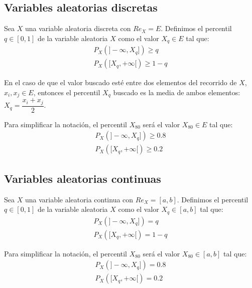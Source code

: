 \subsection{Variables aleatorias discretas}

\begin{definicion}
    Sea $X$ una variable aleatoria discreta con $Re_X=E$. Definimos el percentil $q\in [0, 1]$ de la variable aleatoria $X$ como el valor $X_q \in E$ tal que:
    $$\begin{array}{c}
        P_X(]-\infty, X_q]) \geq q \\
        P_X([X_q, +\infty[) \geq 1-q
    \end{array}$$

    En el caso de que el valor buscado esté entre dos elementos del recorrido de $X$, $x_i, x_j \in E$, entonces el percentil $X_q$ buscado es la media de ambos elementos: $X_q = \dfrac{x_i+x_j}{2}$.
\end{definicion}

\begin{notacion}
    Para simplificar la notación, el percentil $X_{80}$ será el valor $X_{80} \in E$ tal que:
    $$\begin{array}{c}
        P_X(]-\infty, X_q]) \geq 0.8 \\
        P_X([X_q, +\infty[) \geq 0.2
    \end{array}$$
\end{notacion}

\subsection{Variables aleatorias continuas}
\begin{definicion}
    Sea $X$ una variable aleatoria continua con $Re_X = [a,b]$. Definimos el percentil $q \in [0,1]$ de la variable
    aleatoria $X$ como el valor $X_q \in [a,b]$ tal que:
    $$\begin{array}{c}
        P_X(]-\infty, X_q]) = q \\
        P_X([X_q, +\infty[) = 1-q
    \end{array}$$
\end{definicion}
\begin{notacion}
    Para simplificar la notación, el percentil $X_{80}$ será el valor $X_{80} \in [a,b]$ tal que:
    $$\begin{array}{c}
        P_X(]-\infty, X_q]) = 0.8 \\
        P_X([X_q, +\infty[) = 0.2
    \end{array}$$
\end{notacion}

